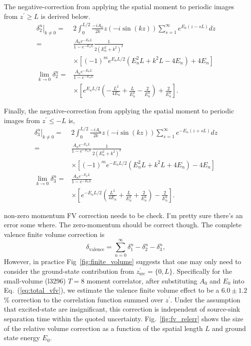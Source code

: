 \documentclass[prd,aps,twocolumn,superscriptaddress,tightenlines,nofootinbib,floatfix,preprintnumbers,10pt]{revtex4-1}
\begin{document}
The negative-correction from applying the spatial moment to periodic images from $z^\prime \geq L$ is derived below. 
\begin{align}
\left.\delta^n_{2}\right|_{k\neq 0} =& 2\int_0^{L/2} \frac{-iA_n}{2k}z(-i\sin(kz)) \sum_{s=1}^\infty e^{E_0(z-sL)} dz \label{eq:dfv_2.1}\\
= & \frac{A_n e^{-E_n L}}{1-e^{-E_n L}}\frac{1}{2(E_n^2+k^2)^2}\nonumber\\
&\times\left[(-1)^m e^{E_n L/2}(E_n^2L+k^2L-4E_n) + 4E_n\right]\label{eq:dfv_2.2}\\
\lim_{k\rightarrow 0}\delta^n_2= & \frac{A_n e^{-E_n L}}{1-e^{-E_n L}}\nonumber\\
&\times\left[e^{E_n L/2} \left( -\frac{L^2}{4E_n} + \frac{L}{E_n^2} -\frac{2}{E_n^3} \right) + \frac{2}{E_n^3}\right].
\label{eq:dfv_2.0}
\end{align}

Finally, the negative-correction from applying the spatial moment to periodic images from $z^\prime \leq -L$ is,
\begin{align}
\left.\delta^n_{3}\right|_{k\neq 0}= & 2\int_{0}^{L/2}  \frac{-iA_n}{2k} z (-i\sin(kz)) \sum_{s=1}^\infty e^{-E_n(z+sL)} dz \label{eq:dfv_3.1}\\
=&\frac{A_n e^{-E_n L}}{1-e^{-E_n L}}\frac{1}{2(E_n^2+k^2)^2}\nonumber\\
&\times\left[(-1)^m e^{-E_n L/2}(E_n^2L+k^2L+4E_n) - 4E_n\right]\\
\lim_{k\rightarrow 0} \delta^n_3= & \frac{A_n e^{-E_n L}}{1-e^{-E_n L}}\nonumber\\
&\times \left[ e^{-E_n L/2}\left(\frac{L^2}{4E_n}+\frac{L}{E_n^2}+\frac{2}{E_n^3}\right)-\frac{2}{E_n^3}\right].
\label{eq:dfv_3.0}
\end{align}

{\color{red} non-zero momentum FV correction needs to be check. I'm pretty sure there's an error some where. The zero-momentum should be correct though.} The complete valence finite volume correction is
\begin{equation}
\delta_{\mathrm{valence}} = \sum_{n=0}^\infty \delta^n_1 - \delta^n_2 - \delta^n_3,
\label{eq:total_vfv}
\end{equation}
However, in practice Fig~\ref{fig:finite_volume} suggests that one may only need to consider the ground-state contribution from $z^\prime_{\mathrm{src}}=\{0, L\}$. Specifically for the small-volume (l3296) $T=8$ moment correlator, after substituting $A_0$ and $E_0$ into Eq.~(\ref{eq:total_vfv}), we estimate the valence finite volume effect to be a $6.0\pm 1.2$\% correction to the correlation function summed over $z^\prime$. Under the assumption that excited-state are insignificant, this correction is independent of source-sink separation time within the quoted uncertainty. Fig.~\ref{fig:fv_relerr} shows the size of the relative volume correction as a function of the spatial length $L$ and ground state energy $E_0$.
\end{document}
